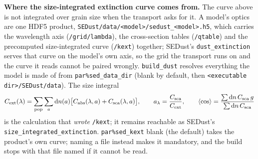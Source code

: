 \documentclass[english,a4paper]{my_memo}
\newcommand{\code}[1]{\texttt{#1}}
\begin{document}
\medskip\noindent
\textbf{Where the size-integrated extinction curve comes from.}
The curve above is not integrated over grain size when the transport asks
for it.  A model's optics are one HDF5 product,
\code{SEDust/data/<model>/sedust\_<model>.h5}, which carries the wavelength
axis (\code{/grid/lambda}), the cross-section tables (\code{/qtable}) and the
precomputed size-integrated curve (\code{/kext}) together; SEDust's
\code{dust\_extinction} serves that curve on the model's own axis, so the
grid the transport runs on and the curve it reads cannot be paired wrongly.
\code{build\_dust} resolves everything the model is made of from
\code{par\%sed\_data\_dir} (blank by default, then
\code{<executable dir>/SEDust/data}).  The size integral
\begin{equation}
  C_{\rm ext}(\lambda) = \sum_{\rm pop}\sum_a {\rm d}n(a)
     \big[C_{\rm abs}(\lambda,a) + C_{\rm sca}(\lambda,a)\big],
  \qquad
  a_\lambda = \frac{C_{\rm sca}}{C_{\rm ext}},
  \qquad
  \langle\cos\rangle = \frac{\sum {\rm d}n\,C_{\rm sca}\,g}
                            {\sum {\rm d}n\,C_{\rm sca}}
\end{equation}
is the calculation that \emph{wrote} \code{/kext}; it remains reachable as
SEDust's \code{size\_integrated\_extinction}.  \code{par\%sed\_kext} blank
(the default) takes the product's own curve; naming a file instead makes it
mandatory, and the build stops with that file named if it cannot be read.
\end{document}
